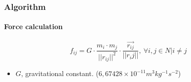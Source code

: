 \frame
{
\frametitle{Algorithm}
\framesubtitle{Force calculation}

    $$f_{ij} =G \cdot \frac{m_i \cdot m_j}{||r_{ij}||^{2}} \cdot \frac{\vec{r_{ij}}}{||r_ij||},\ \forall i,j \in N | i \neq j$$
    \begin{itemize}
        \item $G$, gravitational constant. ($6,67428 \times 10^{-11} m^{3} kg^{-1} s^{-2}$)
    \end{itemize}
}
